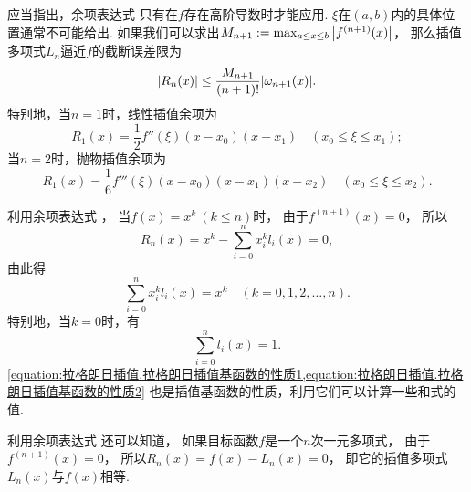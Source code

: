应当指出，余项表达式 
只有在\(f\)存在高阶导数时才能应用.
\(\xi\)在\((a,b)\)内的具体位置通常不可能给出.
如果我们可以求出\(M_{n+1} := \max_{a \leq x \leq b} \abs{f^{(n+1)}(x)}\)，
那么插值多项式\(L_n\)逼近\(f\)的截断误差限为\begin{equation}
	\abs{R_n(x)}
	\leq \frac{M_{n+1}}{(n+1)!} \abs{\omega_{n+1}(x)}.
\end{equation}
特别地，当\(n=1\)时，线性插值余项为\begin{equation}
	R_1(x) = \frac12 f''(\xi) (x-x_0)(x-x_1)
	\quad(x_0 \leq \xi \leq x_1);
\end{equation}
当\(n=2\)时，抛物插值余项为\begin{equation}
	R_1(x) = \frac16 f'''(\xi) (x-x_0)(x-x_1)(x-x_2)
	\quad(x_0 \leq \xi \leq x_2).
\end{equation}

利用余项表达式 ，
当\(f(x) = x^k\ (k \leq n)\)时，
由于\(f^{(n+1)}(x) = 0\)，
所以\begin{equation*}
	R_n(x)
	= x^k - \sum_{i=0}^n x_i^k l_i(x)
	= 0,
\end{equation*}
由此得\begin{equation}\label{equation:拉格朗日插值.拉格朗日插值基函数的性质1}
	\sum_{i=0}^n x_i^k l_i(x)
	= x^k
	\quad(k=0,1,2,\dotsc,n).
\end{equation}
特别地，当\(k=0\)时，有\begin{equation}\label{equation:拉格朗日插值.拉格朗日插值基函数的性质2}
	\sum_{i=0}^n l_i(x) = 1.
\end{equation}
\cref{equation:拉格朗日插值.拉格朗日插值基函数的性质1,equation:拉格朗日插值.拉格朗日插值基函数的性质2}
也是插值基函数的性质，利用它们可以计算一些和式的值.

利用余项表达式  还可以知道，
如果目标函数\(f\)是一个\(n\)次一元多项式，
由于\(f^{(n+1)}(x) = 0\)，
所以\(R_n(x) = f(x) - L_n(x) = 0\)，
即它的插值多项式\(L_n(x)\)与\(f(x)\)相等.

